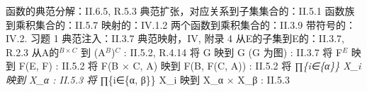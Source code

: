 \begin{Shaded}
\begin{Highlighting}[]

\end{Highlighting}
\end{Shaded}

函数的典范分解：II.6.5, R.5.3 典范扩张，对应关系到子集集合的：II.5.1 函数族到乘积集合的：II.5.7 映射的：IV.1.2 两个函数到乘积集合的：II.3.9 带符号的：IV.2. 习题 1 典范注入：II.3.7 典范映射，IV, 附录 4 从E的子集到E的：II.3.7, R.2.3 从A的\(^{B \times C}\) 到 (A\(^{B}\))\(^{C}\) : II.5.2, R.4.14 将 G 映到 G (G 为图) : II.3.7 将 F\(^{E}\) 映到 F(E, F) : II.5.2 将 F(B × C, A) 映到 F(B, F(C, A)) : II.5.2 将 ∏\emph{\{i∈\{α\}\} X\_i 映到 X\_α : II.5.3 将 ∏}\{i∈\{α, β\}\} X\_i 映到 X\_α × X\_β : II.5.3

